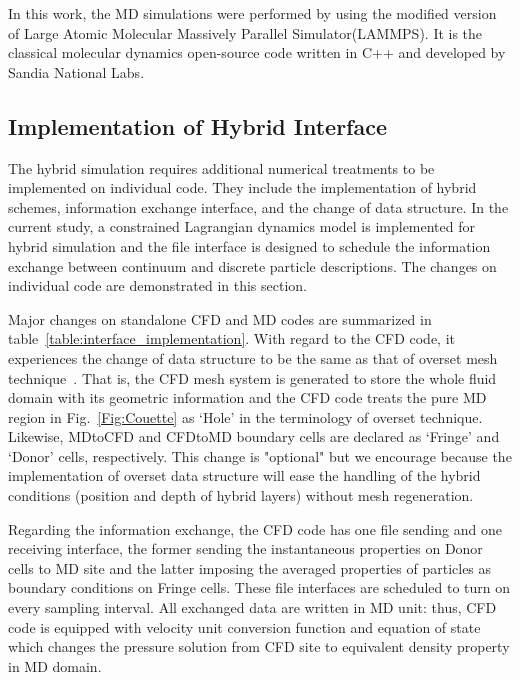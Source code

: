\documentclass[preprint,12pt]{elsarticle}
\begin{document}
In this work,  the MD simulations were performed by using the modified version of Large Atomic Molecular Massively Parallel Simulator(LAMMPS). It is the classical molecular dynamics open-source code written in C++ and developed by Sandia National Labs.~\cite{LAMMPS}



\subsection{Implementation of Hybrid Interface}
The hybrid simulation requires additional numerical treatments to be implemented on individual code. They include the implementation of hybrid schemes, information exchange interface, and the change of data structure. In the current study, a constrained Lagrangian dynamics model is implemented for hybrid simulation and the file interface is designed to schedule the information exchange between continuum and discrete particle descriptions. The changes on individual code are demonstrated in this section.

Major changes on standalone CFD and MD codes are summarized in table~\ref{table:interface_implementation}. With regard to the CFD code, it experiences the change of data structure to be the same as that of overset mesh technique~\cite{Chimera}. That is, the CFD mesh system is generated to store the whole fluid domain with its geometric information and the CFD code treats the pure MD region in Fig.~\ref{Fig:Couette} as `Hole' in the terminology of overset technique. Likewise, MDtoCFD and CFDtoMD boundary cells are declared as `Fringe' and `Donor' cells, respectively. This change is "optional" but we encourage because the implementation of overset data structure will ease the handling of the hybrid conditions (position and depth of hybrid layers) without mesh regeneration.

Regarding the information exchange, the CFD code has one file sending and one receiving interface, the former sending the instantaneous properties on Donor cells to MD site and the latter imposing the averaged properties of particles as boundary conditions on Fringe cells. These file interfaces are scheduled to turn on every sampling interval. All exchanged data are written in MD unit: thus, CFD code is equipped with velocity unit conversion function and equation of state which changes the pressure solution from CFD site to equivalent density property in MD domain.


\end{document}
